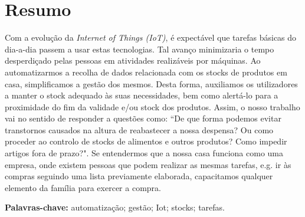 \cleardoublepage\newpage
\chapter*{Resumo} \label{resumo}

Com a evolução da \textit{Internet of Things (IoT)}, é expectável que tarefas básicas do dia-a-dia passem a usar estas tecnologias. Tal avanço minimizaria o tempo desperdiçado pelas pessoas em atividades realizáveis por máquinas. Ao automatizarmos a recolha de dados relacionada com os stocks de produtos em casa, simplificamos a gestão dos mesmos. Desta forma, auxiliamos os utilizadores a manter o stock adequado às suas necessidades, bem como alertá-lo para a proximidade do fim da validade e/ou stock dos produtos. Assim, o nosso trabalho vai no sentido de responder a questões como: ``De que forma podemos evitar transtornos causados na altura de reabastecer a nossa despensa? Ou como proceder ao controlo de stocks de alimentos e outros produtos? Como impedir artigos fora de prazo?". Se entendermos que a nossa casa funciona como uma empresa, onde existem pessoas que podem realizar as mesmas tarefas, e.g. ir às compras seguindo uma lista previamente elaborada, capacitamos qualquer elemento da família para exercer a compra.

\vspace{0.2cm}
{\bf Palavras-chave:} automatização; gestão; Iot; stocks; tarefas.